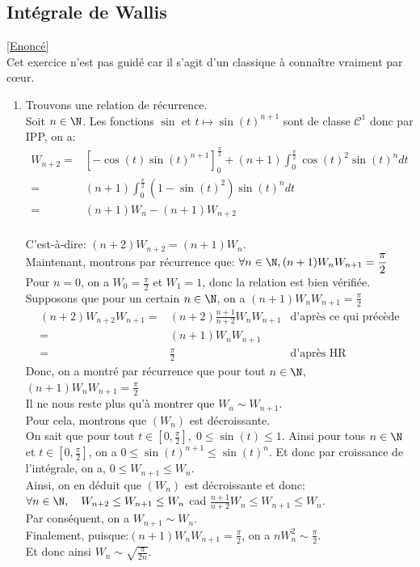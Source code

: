 \documentclass{book}
\begin{document}
	\subsection{Intégrale de Wallis }
	\label{Intégrale de Wallis corrigé}
	\textcolor{blue}{\hyperref[wallis]{[Enoncé]}}\\
	Cet exercice n'est pas guidé car il s'agit d'un classique à connaître vraiment par cœur.
	\begin{enumerate}[leftmargin=*]
		\item Trouvons une relation de récurrence. 
		\\Soit $n\in\N$. Les fonctions $\sin$ et $t\mapsto\sin(t)^{n+1}$ sont de classe $\mathcal{C}^1$ donc par IPP, on a: \begin{align*}
			W_{n+2}=&\left[-\cos(t)\sin(t)^{n+1}\right]_0^{\frac{\pi}{2}}+(n+1)\displaystyle\int_0^{\frac{\pi}{2}}\cos(t)^2\sin(t)^ndt\\
			=&(n+1)\displaystyle\int_0^{\frac{\pi}{2}}(1-\sin(t)^2)\sin(t)^ndt\\
			=&(n+1)W_n-(n+1)W_{n+2}
		\end{align*}
		\\C'est-à-dire: $(n+2)W_{n+2}=(n+1)W_n$.
		\\Maintenant, montrons par récurrence que: $\forall n\in\N,(n+1)W_nW_{n+1}=\displaystyle\frac{\pi}{2}$
		\\Pour $n=0$, on a $W_0=\displaystyle\frac{\pi}{2}$ et $W_1=1$, donc la relation est bien vérifiée.
		\\Supposons que pour un certain $n\in\N$, on a $(n+1)W_nW_{n+1}=\displaystyle\frac{\pi}{2}$
		\begin{align*}
			(n+2)W_{n+2}W_{n+1}=&(n+2)\displaystyle\frac{n+1}{n+2}W_nW_{n+1} &\mbox{d'après ce qui précède}\\
			=&(n+1)W_nW_{n+1}\\
			=&\displaystyle\frac{\pi}{2} &\mbox{d'après HR}
		\end{align*}
		Donc, on a montré par récurrence que pour tout $n\in\N $, $(n+1)W_nW_{n+1}=\displaystyle\frac{\pi}{2}$
		\\Il ne nous reste plus qu'à montrer que $W_n\sim W_{n+1}$.
		\\Pour cela, montrons que $(W_n)$ est décroissante.
		\\On sait que pour tout $t\in\left[0,\displaystyle\frac{\pi}{2}\right],\; 0\leq \sin(t)\leq 1$. Ainsi pour tous $n\in\N$ et $t\in\left[0,\displaystyle\frac{\pi}{2}\right]$, on a $0\leq \sin(t)^{n+1}\leq\sin(t)^n$. Et donc par croissance de l'intégrale, on a, $0\leq W_{n+1}\leq W_n$.
		\\Ainsi, on en déduit que $(W_n)$ est décroissante et donc: $\forall n\in\N, \quad W_{n+2}\leq W_{n+1}\leq W_n$ cad $\displaystyle\frac{n+1}{n+2}W_n\leq W_{n+1}\leq W_n$.
		\\Par conséquent, on a $W_{n+1}\sim W_n$.
		\\Finalement, puisque:$(n+1)W_nW_{n+1}=\displaystyle\frac{\pi}{2}$, on a $nW_n^2\sim \displaystyle\frac{\pi}{2}$.
		\\Et donc ainsi $W_n\sim\displaystyle\sqrt{\frac{\pi}{2n}}$.
		

\end{enumerate}
\end{document}

